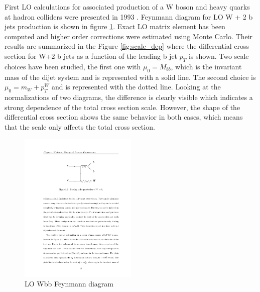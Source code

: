 \par First LO calculations for associated production of a W boson and heavy quarks at hadron colliders were presented in 1993 \cite{Mangano:1992kp}. Feynmann diagram for LO W + 2 b jets production is shown in figure \ref{fig:LO_diag}. Exact LO matrix element has been computed and higher order corrections were estimated using Monte Carlo. Their results are summarized in the Figure \ref{fig:scale_dep} where the differential cross section for W+2 b jets as a function of the leading b jet $p_T$ is shown. Two scale choices have been studied, the first one with $\mu_0=M_{bb}$, which is the invariant mass of the dijet system and is represented with a solid line. The second choice is $\mu_0=m_W+p_T^W$ and is represented with the dotted line. Looking at the normalizations of two diagrams, the difference is clearly visible which indicates a strong dependence of the total cross section scale. However, the shape of the differential cross section shows the same behavior in both cases, which means that the scale only affects the total cross section.      
\begin{figure}[htbp]
	\centering
		\includegraphics[width=0.5\textwidth]{Figures/LO_diag.pdf}
	\caption[LO Wbb Feynmann diagram]{LO Wbb Feynmann diagram}
	\label{fig:LO_diag}
\end{figure}
